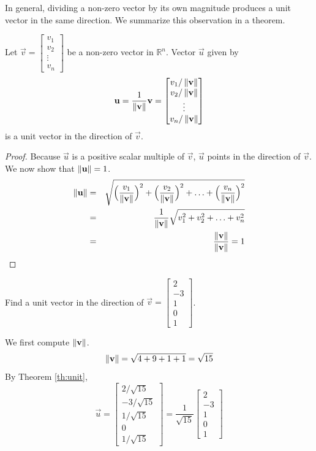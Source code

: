 \documentclass{ximera}
\begin{document}
In general, dividing a non-zero vector by its own magnitude produces a unit vector in the same direction.  We summarize this observation in a theorem.


  \begin{theorem}\label{th:unit} Let $\vec{v}=\begin{bmatrix}v_1\\v_2\\\vdots\\v_n\end{bmatrix}$ be a non-zero vector in $\mathbb{R}^n$. Vector $\vec{u}$ given by
  \begin{equation*}
 \mathbf{u}=\frac{1}{\left\lVert\mathbf{v}\right\rVert}\mathbf{v}=\begin{bmatrix}v_1/\left\lVert\mathbf{v}\right\rVert\\v_2/\left\lVert\mathbf{v}\right\rVert\\\vdots\\v_n/\left\lVert\mathbf{v}\right\rVert\end{bmatrix}
\end{equation*}
is a unit vector in the direction of $\vec{v}$.
\end{theorem}

\begin{proof}
Because $\vec{u}$ is a positive scalar multiple of $\vec{v}$, $\vec{u}$ points in the direction of $\vec{v}$.  We now show that $\left\lVert\mathbf{u}\right\rVert=1$.
\begin{eqnarray*}
\left\lVert\mathbf{u}\right\rVert&=&\sqrt{ \Big(\frac{v_1}{\left\lVert\mathbf{v}\right\rVert}\Big)^2+\Big(\frac{v_2}{\left\lVert\mathbf{v}\right\rVert}\Big)^2+\ldots +\Big(\frac{v_n}{\left\lVert\mathbf{v}\right\rVert}\Big)^2}\\
&=&\frac{1}{\left\lVert\mathbf{v}\right\rVert}\sqrt{v_1^2+v_2^2+\ldots +v_n^2}\\
&=&\frac{\left\lVert\mathbf{v}\right\rVert}{\left\lVert\mathbf{v}\right\rVert}=1
\end{eqnarray*}
\end{proof}


\begin{example}\label{reference}
Find a unit vector in the direction of $\vec{v}=\begin{bmatrix}2\\-3\\1\\0\\1\end{bmatrix}$.

\begin{explanation}
We first compute $\left\lVert\mathbf{v}\right\rVert$.
$$\left\lVert\mathbf{v}\right\rVert=\sqrt{4+9+1+1}=\sqrt{15}$$
By Theorem \ref{th:unit}, 
$$\vec{u}=\begin{bmatrix}2/\sqrt{15}\\-3/\sqrt{15}\\1/\sqrt{15}\\0\\1/\sqrt{15}\end{bmatrix}=\frac{1}{\sqrt{15}}\begin{bmatrix}2\\-3\\1\\0\\1\end{bmatrix}$$
\end{explanation}
\end{example}
\end{document}
